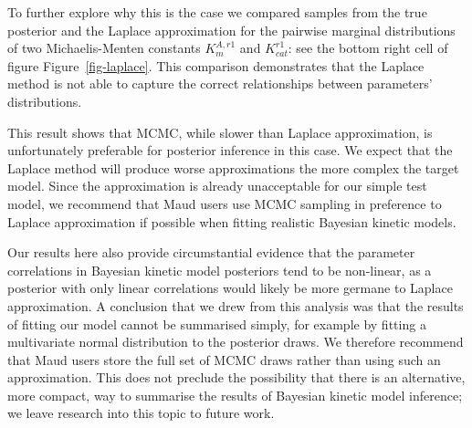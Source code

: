 \documentclass[journal=asbcd6,manuscript=article,layout=traditional]{achemso}
\begin{document}
To further explore why this is the case we compared samples from the
true posterior and the Laplace approximation for the pairwise marginal
distributions of two Michaelis-Menten constants \(K_{m}^{A,r1}\) and
\(K_{cat}^{r1}\): see the bottom right cell of figure
Figure~\ref{fig-laplace}. This comparison demonstrates that the Laplace
method is not able to capture the correct relationships between
parameters' distributions.

This result shows that MCMC, while slower than Laplace approximation, is
unfortunately preferable for posterior inference in this case. We expect
that the Laplace method will produce worse approximations the more
complex the target model. Since the approximation is already
unacceptable for our simple test model, we recommend that Maud users use
MCMC sampling in preference to Laplace approximation if possible when
fitting realistic Bayesian kinetic models.

Our results here also provide circumstantial evidence that the parameter
correlations in Bayesian kinetic model posteriors tend to be non-linear,
as a posterior with only linear correlations would likely be more
germane to Laplace approximation. A conclusion that we drew from this
analysis was that the results of fitting our model cannot be summarised
simply, for example by fitting a multivariate normal distribution to the
posterior draws. We therefore recommend that Maud users store the full
set of MCMC draws rather than using such an approximation. This does not
preclude the possibility that there is an alternative, more compact, way
to summarise the results of Bayesian kinetic model inference; we leave
research into this topic to future work.
\end{document}
